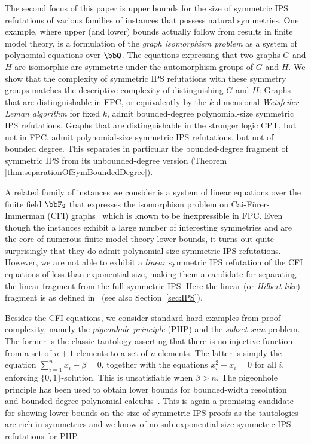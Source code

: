 \documentclass[10pt,a4paper]{article}
\begin{document}
	The second focus of this paper is upper bounds for the size of symmetric IPS refutations of various families of instances that possess natural symmetries. 
	One example, where upper (and lower) bounds actually follow from results in finite model theory, is a formulation of the \emph{graph isomorphism problem} as a system of polynomial equations \cite{GI} over $\bbQ$. The equations expressing that two graphs $G$ and $H$ are isomorphic are symmetric under the automorphism groups of $G$ and $H$. We show that the complexity of symmetric IPS refutations with these symmetry groups matches the descriptive complexity of distinguishing $G$ and $H$: Graphs that are distinguishable in FPC, or equivalently by the $k$-dimensional \emph{Weisfeiler-Leman algorithm} \cite{sandraSiglog} for fixed $k$, admit bounded-degree polynomial-size symmetric IPS refutations. Graphs that are distinguishable in the stronger logic CPT, but not in FPC, admit polynomial-size symmetric IPS refutations, but not of bounded degree. This separates in particular the bounded-degree fragment of symmetric IPS from its unbounded-degree version (Theorem \ref{thm:separationOfSymBoundedDegree}).
	
	A related family of instances we consider is a system of linear equations over the finite field $\bbF_2$ that expresses the isomorphism problem on Cai-Fürer-Immerman (CFI) graphs~\cite{caifurimm92, atseriasBulatovDawar} which is known to be inexpressible in FPC. Even though the instances exhibit a large number of interesting symmetries and are the core of numerous finite model theory lower bounds, it turns out quite surprisingly that they do admit polynomial-size symmetric IPS refutations. 
	However, we are not able to exhibit a \emph{linear} symmetric IPS refutation of the CFI equations of less than exponential size, making them a candidate for separating the linear fragment from the full symmetric IPS.  Here the linear (or \emph{Hilbert-like}) fragment is as defined in~\cite{IPS} (see also Section~\ref{sec:IPS}).
	
	Besides the CFI equations, we consider standard hard examples from proof complexity, namely the \emph{pigeonhole principle} (PHP) and the \emph{subset sum} problem. The former is the classic tautology asserting that there is no injective function from a set of $n+1$ elements to a set of $n$ elements. The latter is simply the equation $\sum_{i=1}^n x_i - \beta = 0$, together with the equations $x_i^2 - x_i = 0$ for all $i$, enforcing $\{0,1\}$-solution. This is unsatisfiable when $\beta > n$.  The pigeonhole principle has been used to obtain lower bounds for bounded-width resolution~\cite{haken} and bounded-degree polynomial calculus~\cite{razborov1998lower}.  This is again a promising candidate for showing lower bounds on the size of symmetric IPS proofs as the tautologies are rich in symmetries and we know of no sub-exponential size symmetric IPS refutations for PHP.
	
\end{document}
